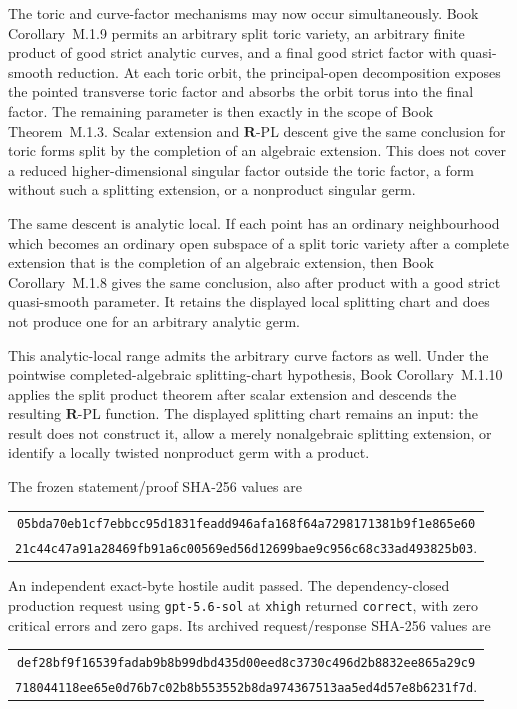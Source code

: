 \documentclass[11pt,a4paper]{article}
\theoremstyle{definition}
\theoremstyle{remark}
\begin{document}
The toric and curve-factor mechanisms may now occur simultaneously.
Book Corollary~M.1.9 permits an arbitrary
split toric variety, an arbitrary finite product of good strict analytic
curves, and a final good strict factor with quasi-smooth reduction.  At each
toric orbit, the principal-open decomposition exposes the pointed transverse
toric factor and absorbs the orbit torus into the final factor.  The
remaining parameter is then exactly in the scope of
Book Theorem~M.1.3.  Scalar extension and
\(\mathbf R\)-PL descent give the same conclusion for toric forms split by the
completion of an algebraic extension.  This does not cover a reduced
higher-dimensional singular factor outside the toric factor, a form without
such a splitting extension, or a nonproduct singular germ.

The same descent is analytic local.  If each point has an ordinary
neighbourhood which becomes an ordinary open subspace of a split toric
variety after a complete extension that is the completion of an algebraic
extension, then
Book Corollary~M.1.8 gives the same
conclusion, also after product with a good strict quasi-smooth parameter.
It retains the displayed local splitting chart and does not produce one for
an arbitrary analytic germ.

This analytic-local range admits the arbitrary curve factors as well.
Under the pointwise completed-algebraic splitting-chart hypothesis,
Book Corollary~M.1.10 applies the
split product theorem after scalar extension and descends the resulting
\(\mathbf R\)-PL function.  The displayed splitting chart remains an input:
the result does not construct it, allow a merely nonalgebraic splitting
extension, or identify a locally twisted nonproduct germ with a product.

The frozen statement/proof SHA-256 values are
\begin{center}
\small
\begin{tabular}{@{}c@{}}
\nolinkurl{05bda70eb1cf7ebbcc95d1831feadd946afa168f64a7298171381b9f1e865e60}\\
\nolinkurl{21c44c47a91a28469fb91a6c00569ed56d12699bae9c956c68c33ad493825b03}.
\end{tabular}
\end{center}
An independent exact-byte hostile audit passed.  The dependency-closed
production request using \texttt{gpt-5.6-sol} at \texttt{xhigh} returned
\texttt{correct}, with zero critical errors and zero gaps.  Its archived
request/response SHA-256 values are
\begin{center}
\small
\begin{tabular}{@{}c@{}}
\nolinkurl{def28bf9f16539fadab9b8b99dbd435d00eed8c3730c496d2b8832ee865a29c9}\\
\nolinkurl{718044118ee65e0d76b7c02b8b553552b8da974367513aa5ed4d57e8b6231f7d}.
\end{tabular}
\end{center}
\end{document}
